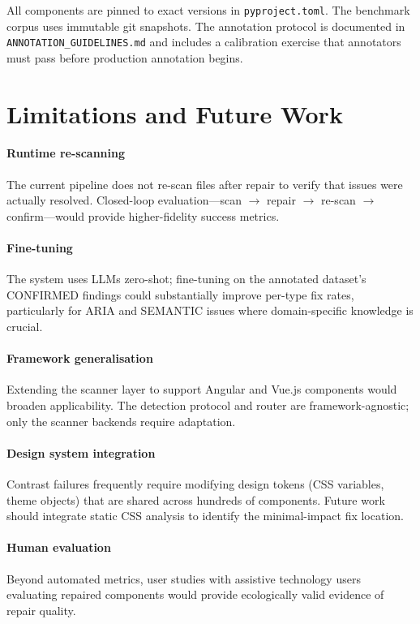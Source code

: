 \documentclass[10pt,conference]{IEEEtran}
\begin{document}
All components are pinned to exact versions in \texttt{pyproject.toml}.  The
benchmark corpus uses immutable git snapshots.  The annotation protocol is
documented in \texttt{ANNOTATION\_GUIDELINES.md} and includes a calibration
exercise that annotators must pass before production annotation begins.

\section{Limitations and Future Work}
\label{sec:future}

\paragraph{Runtime re-scanning} The current pipeline does not re-scan files
after repair to verify that issues were actually resolved.  Closed-loop
evaluation—scan $\rightarrow$ repair $\rightarrow$ re-scan $\rightarrow$
confirm—would provide higher-fidelity success metrics.

\paragraph{Fine-tuning} The system uses LLMs zero-shot; fine-tuning on the
annotated dataset's CONFIRMED findings could substantially improve per-type
fix rates, particularly for ARIA and SEMANTIC issues where domain-specific
knowledge is crucial.

\paragraph{Framework generalisation} Extending the scanner layer to support
Angular and Vue.js components would broaden applicability.  The detection
protocol and router are framework-agnostic; only the scanner backends require
adaptation.

\paragraph{Design system integration} Contrast failures frequently require
modifying design tokens (CSS variables, theme objects) that are shared across
hundreds of components.  Future work should integrate static CSS analysis to
identify the minimal-impact fix location.

\paragraph{Human evaluation} Beyond automated metrics, user studies with
assistive technology users evaluating repaired components would provide
ecologically valid evidence of repair quality.
\end{document}
